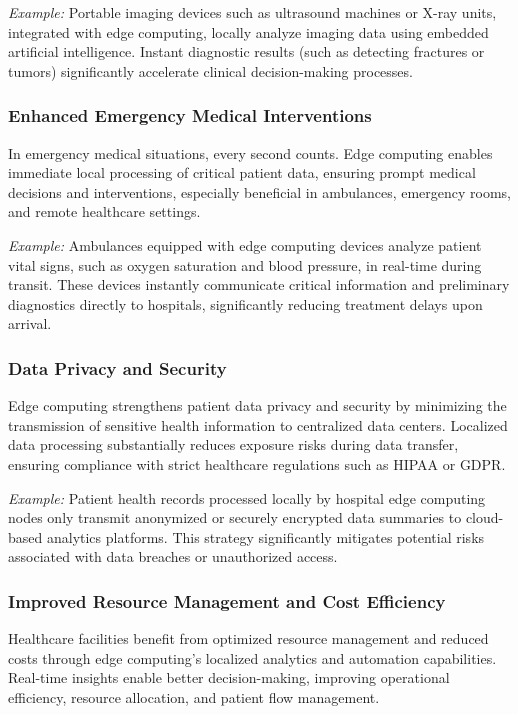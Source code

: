 \documentclass[runningheads]{llncs}
\begin{document}
\noindent\textit{Example:} Portable imaging devices such as ultrasound machines or X-ray units, integrated with edge computing, locally analyze imaging data using embedded artificial intelligence. Instant diagnostic results (such as detecting fractures or tumors) significantly accelerate clinical decision-making processes.

\subsubsection{Enhanced Emergency Medical Interventions}
In emergency medical situations, every second counts. Edge computing enables immediate local processing of critical patient data, ensuring prompt medical decisions and interventions, especially beneficial in ambulances, emergency rooms, and remote healthcare settings.

\noindent\textit{Example:} Ambulances equipped with edge computing devices analyze patient vital signs, such as oxygen saturation and blood pressure, in real-time during transit. These devices instantly communicate critical information and preliminary diagnostics directly to hospitals, significantly reducing treatment delays upon arrival.

\subsubsection{Data Privacy and Security}
Edge computing strengthens patient data privacy and security by minimizing the transmission of sensitive health information to centralized data centers. Localized data processing substantially reduces exposure risks during data transfer, ensuring compliance with strict healthcare regulations such as HIPAA or GDPR.

\noindent\textit{Example:} Patient health records processed locally by hospital edge computing nodes only transmit anonymized or securely encrypted data summaries to cloud-based analytics platforms. This strategy significantly mitigates potential risks associated with data breaches or unauthorized access.

\subsubsection{Improved Resource Management and Cost Efficiency}
Healthcare facilities benefit from optimized resource management and reduced costs through edge computing’s localized analytics and automation capabilities. Real-time insights enable better decision-making, improving operational efficiency, resource allocation, and patient flow management.
\end{document}
